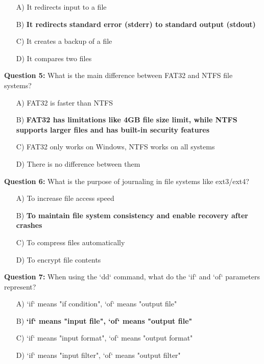 \begin{enumerate}
    \item[A)] It redirects input to a file
    \item[B)] \textbf{It redirects standard error (stderr) to standard output (stdout)}
    \item[C)] It creates a backup of a file
    \item[D)] It compares two files
\end{enumerate}

\textbf{Question 5:} What is the main difference between FAT32 and NTFS file systems?

\begin{enumerate}
    \item[A)] FAT32 is faster than NTFS
    \item[B)] \textbf{FAT32 has limitations like 4GB file size limit, while NTFS supports larger files and has built-in security features}
    \item[C)] FAT32 only works on Windows, NTFS works on all systems
    \item[D)] There is no difference between them
\end{enumerate}

\textbf{Question 6:} What is the purpose of journaling in file systems like ext3/ext4?

\begin{enumerate}
    \item[A)] To increase file access speed
    \item[B)] \textbf{To maintain file system consistency and enable recovery after crashes}
    \item[C)] To compress files automatically
    \item[D)] To encrypt file contents
\end{enumerate}

\textbf{Question 7:} When using the `dd` command, what do the `if` and `of` parameters represent?

\begin{enumerate}
    \item[A)] `if` means "if condition", `of` means "output file"
    \item[B)] \textbf{`if` means "input file", `of` means "output file"}
    \item[C)] `if` means "input format", `of` means "output format"
    \item[D)] `if` means "input filter", `of` means "output filter"
\end{enumerate}

